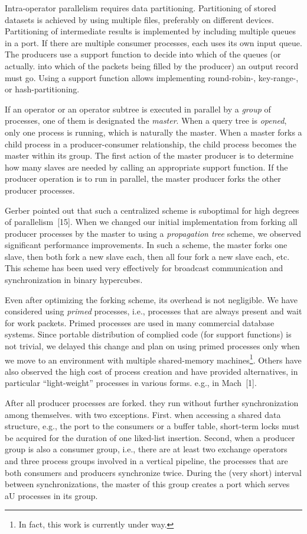 \documentclass[a4paper,11pt,notitlepage,twoside,openright]{article}
\begin{document}
Intra-operator parallelism requires data partitioning.
Partitioning of stored datasets is achieved by using multiple
files, preferably on different devices. Partitioning of intermediate
results is implemented by including multiple queues
in a port. If there are multiple consumer processes, each
uses its own input queue. The producers use a support
function to decide into which of the queues (or actually.
into which of the packets being filled by the producer) an
output record must go. Using a support function allows
implementing round-robin-, key-range-, or hash-partitioning.

If an operator or an operator subtree is executed in
parallel by a \emph{group} of processes, one of them is designated
the \emph{master}. When a query tree is \emph{opened}, only one process
is running, which is naturally the master. When a master
forks a child process in a producer-consumer relationship,
the child process becomes the master within its group. The
first action of the master producer is to determine how
many slaves are needed by calling an appropriate support
function. If the producer operation is to run in parallel, the
master producer forks the other producer processes.

Gerber pointed out that such a centralized scheme is
suboptimal for high degrees of parallelism~{[15]}. When we
changed our initial implementation from forking all producer
processes by the master to using a \emph{propagation tree} scheme,
we observed significant performance improvements. In such
a scheme, the master forks one slave, then both fork a new
slave each, then all four fork a new slave each, etc. This
scheme has been used very effectively for broadcast communication
and synchronization in binary hypercubes.

Even after optimizing the forking scheme, its overhead
is not negligible. We have considered using \emph{primed}
processes, i.e., processes that are always present and wait
for work packets. Primed processes are used in many commercial
database systems. Since portable distribution of
complied code (for support functions) is not trivial, we
delayed this change and plan on using primed processes
only when we move to an environment with multiple
shared-memory machines\footnote{%
In fact, this work is currently under way.
}. Others have also observed the
high cost of process creation and have provided alternatives,
in particular ``light-weight'' processes in various forms. e.g.,
in Mach~{[1]}.

After all producer processes are forked. they run
without further synchronization among themselves. with two
exceptions. First. when accessing a shared data structure,
e.g., the port to the consumers or a buffer table, short-term
locks must be acquired for the duration of one liked-list
insertion. Second, when a producer group is also a consumer
group, i.e., there are at least two exchange operators
and three process groups involved in a vertical pipeline, the
processes that are both consumers and producers synchronize
twice. During the (very short) interval between synchronizations,
the master of this group creates a port which serves
aU processes in its group.
\end{document}
